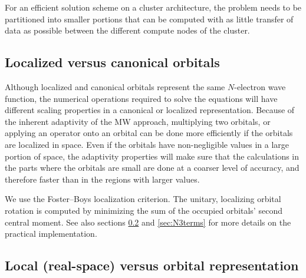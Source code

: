 \documentclass[journal=jctcce, manuscript=article]{achemso}
\begin{document}
For an efficient solution scheme on a cluster architecture, the problem needs to be partitioned into smaller portions that can be computed with as little transfer of data as possible between the different compute nodes of the cluster.

\subsection{Localized versus canonical orbitals}

Although localized and canonical orbitals represent the same $N$-electron wave function, the numerical operations required to solve the equations will have different scaling properties in a canonical or localized representation.
Because of the inherent adaptivity of the \ac{MW} approach, multiplying two orbitals, or applying an operator onto an orbital can be done more efficiently if the orbitals are localized in space. Even if the orbitals have non-negligible values in a large portion of space, the adaptivity properties will make sure that the calculations in the parts where the orbitals are small are done at a coarser level of accuracy, and therefore faster than in the regions with larger values.

We use the Foster--Boys localization criterion.\cite{Foster1960} The unitary, localizing orbital rotation is computed by minimizing the sum of the occupied orbitals' second central moment.\cite{Hoyvik2016-cw} See also sections \ref{sec:localvsorb} and \ref{sec:N3terms} for more details on the practical implementation.

\subsection{Local (real-space) versus orbital representation}
\label{sec:localvsorb}
\end{document}
